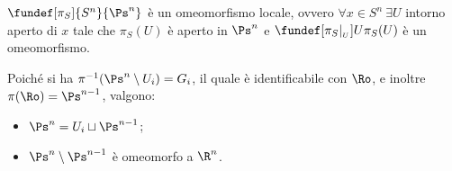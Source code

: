 \begin{ex}
	$\fundef[\pi_S]{S^n}{\Ps^n}$ è un omeomorfismo locale, ovvero
	$\forall x \in S^n \ \exists U$ intorno aperto di $x$ tale che $\pi_S(U)$
	è aperto in $\Ps^n$ e  $\fundef[\pi_S | _{_U}]{U}{\pi_S(U)}$  è un omeomorfismo.
\end{ex}


Poiché si ha $\pi^{-1}(\Ps^n \setminus U_i) = G_i$,
il quale è identificabile con $\Ro$,
e inoltre $\pi(\Ro) = \Ps^{n-1}$, valgono:
\begin{itemize}
	\item $\Ps^n = U_i \sqcup \Ps^{n-1}$;
	\item $\Ps^n \setminus \Ps^{n-1}$ è omeomorfo a $\R^n$.
\end{itemize}
